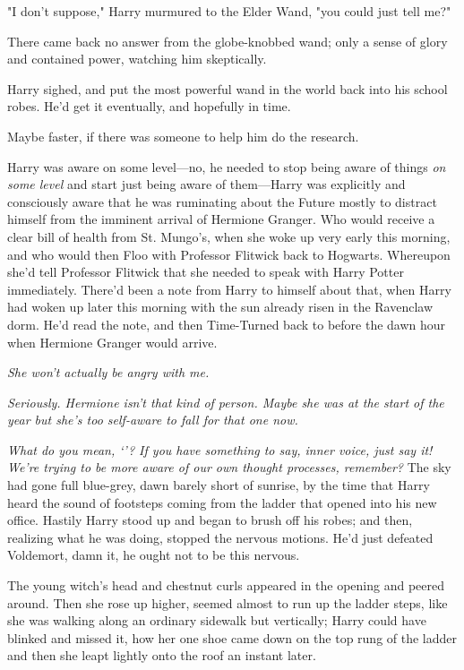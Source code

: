 "I don't suppose," Harry murmured to the Elder Wand, "you could just tell me?"

There came back no answer from the globe-knobbed wand; only a sense of glory
and contained power, watching him skeptically.

Harry sighed, and put the most powerful wand in the world back into his school
robes. He'd get it eventually, and hopefully in time.

Maybe faster, if there was someone to help him do the research.

Harry was aware on some level---no, he needed to stop being aware of things
\emph{on some level} and start just being aware of them---Harry was explicitly
and consciously aware that he was ruminating about the Future mostly to
distract himself from the imminent arrival of Hermione Granger. Who would
receive a clear bill of health from St. Mungo's, when she woke up very early
this morning, and who would then Floo with Professor Flitwick back to Hogwarts.
Whereupon she'd tell Professor Flitwick that she needed to speak with Harry
Potter immediately. There'd been a note from Harry to himself about that, when
Harry had woken up later this morning with the sun already risen in the
Ravenclaw dorm. He'd read the note, and then Time-Turned back to before the
dawn hour when Hermione Granger would arrive.

\emph{She won't actually be angry with me.}

{\el}

\emph{Seriously. Hermione isn't that kind of person. Maybe she was at the start
of the year but she's too self-aware to fall for that one now.}

{\el}

\emph{What do you mean, `{\el}'? If you have something to say, inner voice,
just say it! We're trying to be more aware of our own thought processes,
remember?}
\sbreak
The sky had gone full blue-grey, dawn barely short of sunrise, by the time that
Harry heard the sound of footsteps coming from the ladder that opened into his
new office. Hastily Harry stood up and began to brush off his robes; and then,
realizing what he was doing, stopped the nervous motions. He'd just defeated
Voldemort, damn it, he ought not to be this nervous.

The young witch's head and chestnut curls appeared in the opening and peered
around. Then she rose up higher, seemed almost to run up the ladder steps, like
she was walking along an ordinary sidewalk but vertically; Harry could have
blinked and missed it, how her one shoe came down on the top rung of the ladder
and then she leapt lightly onto the roof an instant later.

